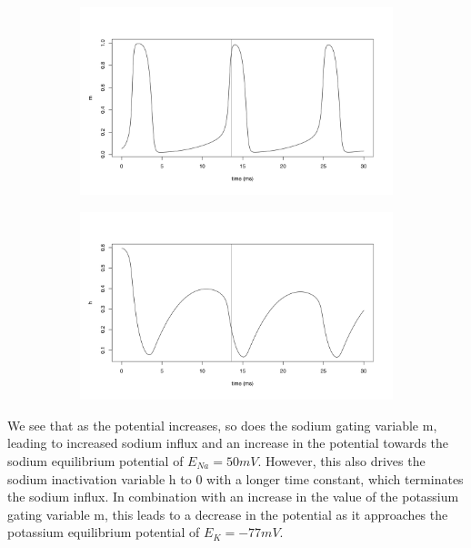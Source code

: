 \documentclass{article}
\begin{document}
\begin{figure}[h]
\begin{subfigure}[t]{0.45\linewidth}
		\label{fig:hhn}	
	\end{subfigure}%
	\hspace{0.05\linewidth}
	\begin{subfigure}[t]{0.45\linewidth}
		\centering
		\includegraphics[width = 1.0\linewidth, trim={20 30 40 70}, clip=true]{hh_m.png}
		\label{fig:hhm}	
	\end{subfigure}%
	\hspace{0.05\linewidth}
	\begin{subfigure}[t]{0.45\linewidth}
		\centering
		\includegraphics[width = 1.0\linewidth, trim={20 30 40 70}, clip=true]{hh_h.png}
		\label{fig:hhh}	
	\end{subfigure}%
\label{fig:hh}
\end{figure}

We see that as the potential increases, so does the sodium gating variable m, leading to increased sodium influx and an increase in the potential towards the sodium equilibrium potential of $E_{Na} = 50 mV$. However, this also drives the sodium inactivation variable h to 0 with a longer time constant, which terminates the sodium influx. In combination with an increase in the value of the potassium gating variable m, this leads to a decrease in the potential as it approaches the potassium equilibrium potential of $E_K = -77 mV$.
\end{document}
